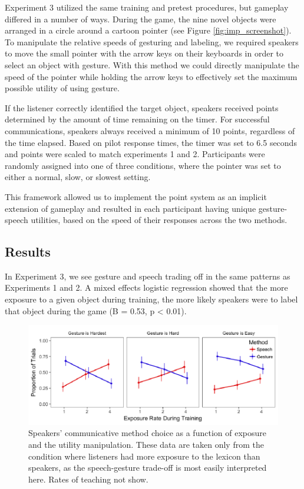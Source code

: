 \documentclass[10pt, letterpaper]{article}
\newenvironment{CodeChunk}{}{}
\begin{document}
Experiment 3 utilized the same training and pretest procedures, but
gameplay differed in a number of ways. During the game, the nine novel
objects were arranged in a circle around a cartoon pointer (see Figure
\ref{fig:imp_screenshot}). To manipulate the relative speeds of
gesturing and labeling, we required speakers to move the small pointer
with the arrow keys on their keyboards in order to select an object with
gesture. With this method we could directly manipulate the speed of the
pointer while holding the arrow keys to effectively set the maximum
possible utility of using gesture.

If the listener correctly identified the target object, speakers
received points determined by the amount of time remaining on the timer.
For successful communications, speakers always received a minimum of 10
points, regardless of the time elapsed. Based on pilot response times,
the timer was set to 6.5 seconds and points were scaled to match
experiments 1 and 2. Participants were randomly assigned into one of
three conditions, where the pointer was set to either a normal, slow, or
slowest setting.

This framework allowed us to implement the point system as an implicit
extension of gameplay and resulted in each participant having unique
gesture-speech utilities, based on the speed of their responses across
the two methods.

\subsection{Results}\label{results-2}

In Experiment 3, we see gesture and speech trading off in the same
patterns as Experiments 1 and 2. A mixed effects logistic regression
showed that the more exposure to a given object during training, the
more likely speakers were to label that object during the game (B =
0.53, p \textless{} 0.01).

\begin{CodeChunk}
\begin{figure}[H]

{\centering \includegraphics{figs/imp_speech_gesture-1} 

}

\caption[Speakers' communicative method choice as a function of exposure and the utility manipulation]{Speakers' communicative method choice as a function of exposure and the utility manipulation. These data are taken only from the condition where listeners had more exposure to the lexicon than speakers, as the speech-gesture trade-off is most easily interpreted here. Rates of teaching not show.}\label{fig:imp_speech_gesture}
\end{figure}
\end{CodeChunk}
\end{document}

